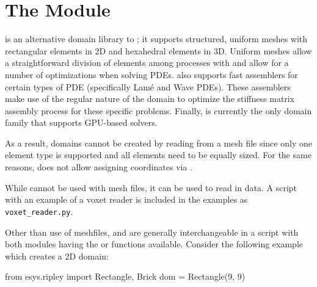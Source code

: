 
%
%
%

\chapter{The \ripley Module}\label{chap:ripley}

\ripley is an alternative domain library to \finley; it supports structured, uniform meshes with rectangular elements in 2D and hexahedral elements in 3D.
Uniform meshes allow a straightforward division of elements among processes
with \MPI and allow for a number of optimizations when solving PDEs.
\ripley also supports fast assemblers for certain types of PDE (specifically
Lam\'e and Wave PDEs).
These assemblers make use of the regular nature of the domain to optimize the
stiffness matrix assembly process for these specific problems.
Finally, \ripley is currently the only domain family that supports GPU-based
solvers.

As a result, \ripley domains cannot be created by reading from a mesh file
since only one element type is supported and all elements need to be equally
sized.
For the same reasons, \ripley does not allow assigning coordinates via
.

While \ripley cannot be used with mesh files, it can be used to read in \GOCAD {} 
data. A script with an example of a voxet reader is included in the examples as
\texttt{voxet_reader.py}.

Other than use of meshfiles, \ripley and \finley are generally interchangeable in a script
with both modules having the  or  functions
available. Consider the following example which creates a 2D \ripley domain:

\begin{python}
 from esys.ripley import Rectangle, Brick
 dom = Rectangle(9, 9)
\end{python}




